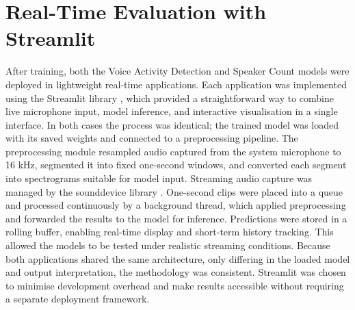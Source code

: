 \section{Real-Time Evaluation with Streamlit}
After training, both the Voice Activity Detection and Speaker Count models were deployed in lightweight real-time applications. Each application was implemented using the Streamlit library \cite{streamlit}, which provided a straightforward way to combine live microphone input, model inference, and interactive visualisation in a single interface. In both cases the process was identical; the trained model was loaded with its saved weights and connected to a preprocessing pipeline. The preprocessing module resampled audio captured from the system microphone to 16 kHz, segmented it into fixed one-second windows, and converted each segment into spectrograms suitable for model input. \newline\newline Streaming audio capture was managed by the sounddevice library \cite{sounddevice}. One-second clips were placed into a queue and processed continuously by a background thread, which applied preprocessing and forwarded the results to the model for inference. Predictions were stored in a rolling buffer, enabling real-time display and short-term history tracking. This allowed the models to be tested under realistic streaming conditions. Because both applications shared the same architecture, only differing in the loaded model and output interpretation, the methodology was consistent. Streamlit was chosen to minimise development overhead and make results accessible without requiring a separate deployment framework.